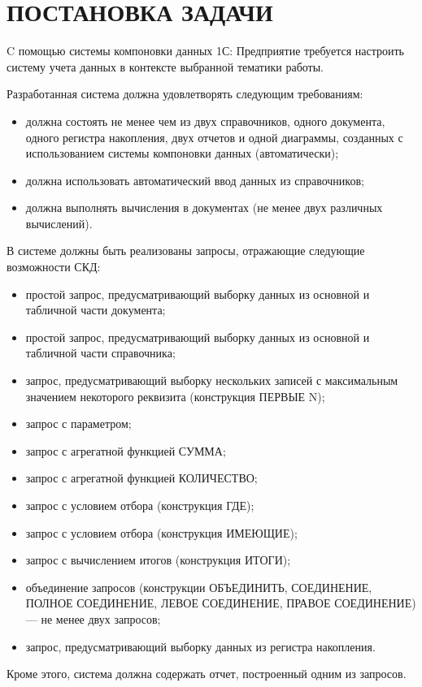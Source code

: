 \section[Постановка задачи]{ПОСТАНОВКА ЗАДАЧИ}

C помощью системы компоновки данных 1С: Предприятие требуется настроить систему
учета данных в контексте выбранной тематики работы.

Разработанная система должна удовлетворять следующим требованиям:
\begin{itemize}
\item должна состоять не менее чем из
  двух справочников,
  одного документа,
  одного регистра накопления,
  двух отчетов и
  одной диаграммы, созданных с использованием системы компоновки данных (автоматически);
\item должна использовать автоматический ввод данных из справочников;
\item должна выполнять вычисления в документах (не менее двух различных вычислений).
\end{itemize}

В системе должны быть реализованы запросы, отражающие следующие возможности СКД:
\begin{itemize}
\item простой запрос, предусматривающий выборку данных
  из основной и табличной части документа;
\item простой запрос, предусматривающий выборку данных
  из основной и табличной части справочника;
\item запрос, предусматривающий выборку нескольких записей с
  максимальным значением некоторого реквизита (конструкция ПЕРВЫЕ N);
\item запрос с параметром;
\item запрос с агрегатной функцией СУММА;
\item запрос с агрегатной функцией КОЛИЧЕСТВО;
\item запрос с условием отбора (конструкция ГДЕ);
\item запрос с условием отбора (конструкция ИМЕЮЩИЕ);
\item запрос с вычислением итогов (конструкция ИТОГИ);
\item объединение запросов (конструкции ОБЪЕДИНИТЬ, СОЕДИНЕНИЕ,
  ПОЛНОЕ СОЕДИНЕНИЕ, ЛЕВОЕ СОЕДИНЕНИЕ, ПРАВОЕ СОЕДИНЕНИЕ) --- не менее двух запросов;
\item запрос, предусматривающий выборку данных из регистра накопления.
\end{itemize}

Кроме этого, система должна содержать отчет, построенный одним из запросов.
